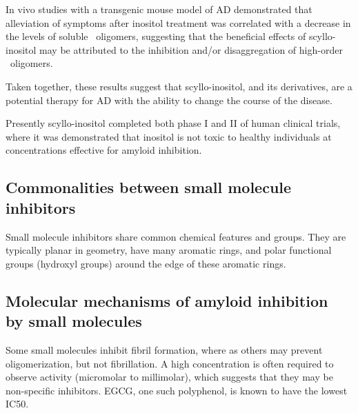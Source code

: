 In vivo studies with a transgenic mouse model of AD demonstrated that alleviation of symptoms after inositol treatment was correlated with a decrease in the levels of soluble \abeta\ oligomers, suggesting that the beneficial effects of scyllo-inositol may be attributed to the inhibition and/or disaggregation of high-order \abeta\ oligomers.\cite{McLaurin:2006eb}

Taken together, these results suggest that scyllo-inositol, and its derivatives, are a potential therapy for AD with the ability to change the course of the disease.\cite{Nitz:2008jl,Sun:2008ko}

Presently scyllo-inositol completed both phase I and II of human clinical trials, where it was demonstrated that inositol is not toxic to healthy individuals at concentrations effective for amyloid inhibition.

\subsection{Commonalities between small molecule inhibitors}
Small molecule inhibitors share common chemical features and groups.  They are typically planar in geometry, have many aromatic rings, and polar functional groups (hydroxyl groups) around the edge of these aromatic rings.



\subsection{Molecular mechanisms of amyloid inhibition 
	            \\ by small molecules}
Some small molecules inhibit fibril formation, where as others may prevent oligomerization, but not fibrillation. A high concentration is often required to observe activity (micromolar to millimolar), which suggests that they may be non-specific inhibitors. EGCG, one such polyphenol, is known to have the lowest IC50.
      
